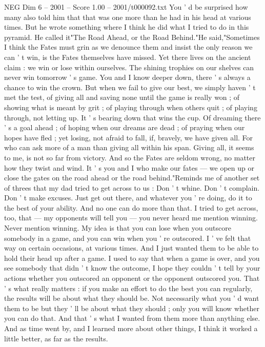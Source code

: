 \begin{textsample}{NEG Dim 6 – 2001 – Score 1.00 – 2001/t000092.txt}
You ' d be surprised how many also told him that that was one more than he had in his head at various times.
But he wrote something where I think he did what I tried to do in this pyramid.
He called it"The Road Ahead, or the Road Behind."He said,"Sometimes I think the Fates must grin as we denounce them and insist the only reason we can ' t win, is the Fates themselves have missed.
Yet there lives on the ancient claim : we win or lose within ourselves.
The shining trophies on our shelves can never win tomorrow ' s game.
You and I know deeper down, there ' s always a chance to win the crown.
But when we fail to give our best, we simply haven ' t met the test, of giving all and saving none until the game is really won ; of showing what is meant by grit ; of playing through when others quit ; of playing through, not letting up.
It ' s bearing down that wins the cup.
Of dreaming there ' s a goal ahead ; of hoping when our dreams are dead ; of praying when our hopes have fled ; yet losing, not afraid to fall, if, bravely, we have given all.
For who can ask more of a man than giving all within his span.
Giving all, it seems to me, is not so far from victory.
And so the Fates are seldom wrong, no matter how they twist and wind.
It ' s you and I who make our fates — we open up or close the gates on the road ahead or the road behind."Reminds me of another set of threes that my dad tried to get across to us : Don ' t whine.
Don ' t complain.
Don ' t make excuses.
Just get out there, and whatever you ' re doing, do it to the best of your ability.
And no one can do more than that.
I tried to get across, too, that — my opponents will tell you — you never heard me mention winning.
Never mention winning.
My idea is that you can lose when you outscore somebody in a game, and you can win when you ' re outscored.
I ' ve felt that way on certain occasions, at various times.
And I just wanted them to be able to hold their head up after a game.
I used to say that when a game is over, and you see somebody that didn ' t know the outcome, I hope they couldn ' t tell by your actions whether you outscored an opponent or the opponent outscored you.
That ' s what really matters : if you make an effort to do the best you can regularly, the results will be about what they should be.
Not necessarily what you ' d want them to be but they ' ll be about what they should ; only you will know whether you can do that.
And that ' s what I wanted from them more than anything else.
And as time went by, and I learned more about other things, I think it worked a little better, as far as the results.

\end{textsample}
